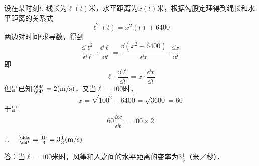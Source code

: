 \begin{solution}
    设在某时刻$t$, 线长为$\ell(t)$米，水平距离为$x(t)$米，根据勾股定理得到绳长和水平距离的关系式
\[\ell^2 (t) =x^2 (t) +6400\]
两边对时间$t$求导数，得到
\[\frac{\dd \ell^2}{\dd \ell}\cdot \frac{\dd \ell}{\dd t}=\frac{\dd(x^2+6400)}{\dd x}\cdot \frac{\dd x}{\dd t}\]
即
\[\ell\cdot \frac{\dd \ell}{\dd t}=x\cdot \frac{\dd x}{\dd t}\]
但是已知$\frac{\dd\ell}{\dd t}=2({\rm m/s})$，又当$\ell=100$时，
\[x=\sqrt{100^2-6400}=\sqrt{3600}=60\]
于是
\[60\frac{\dd x}{\dd t}=100\times 2\]

$\therefore\quad \frac{\dd x}{\dd t}=\frac{10}{3}=3\frac{1}{3}({\rm m/s})$

答：当$\ell=100$米时，风筝和人之间的水平距离的变率为$3\frac{1}{3}$（米／秒）．
\end{solution}

